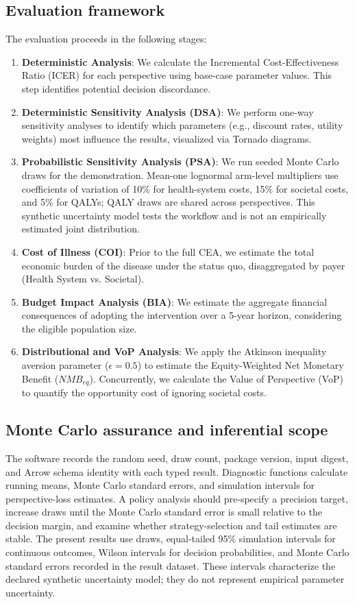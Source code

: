 \documentclass[article]{jss}
\begin{document}
\subsection{Evaluation framework}
The evaluation proceeds in the following stages:
\begin{enumerate}
    \item \textbf{Deterministic Analysis}: We calculate the Incremental Cost-Effectiveness Ratio (ICER) for each perspective using base-case parameter values. This step identifies potential decision discordance.
    \item \textbf{Deterministic Sensitivity Analysis (DSA)}: We perform one-way sensitivity analyses to identify which parameters (e.g., discount rates, utility weights) most influence the results, visualized via Tornado diagrams.
    \item \textbf{Probabilistic Sensitivity Analysis (PSA)}: We run \PublicationDrawCount{} seeded Monte Carlo draws for the demonstration. Mean-one lognormal arm-level multipliers use coefficients of variation of 10\% for health-system costs, 15\% for societal costs, and 5\% for QALYs; QALY draws are shared across perspectives. This synthetic uncertainty model tests the workflow and is not an empirically estimated joint distribution.
    \item \textbf{Cost of Illness (COI)}: Prior to the full CEA, we estimate the total economic burden of the disease under the status quo, disaggregated by payer (Health System vs. Societal).
    \item \textbf{Budget Impact Analysis (BIA)}: We estimate the aggregate financial consequences of adopting the intervention over a 5-year horizon, considering the eligible population size.
    \item \textbf{Distributional and VoP Analysis}: We apply the Atkinson inequality aversion parameter ($\epsilon=0.5$) to estimate the Equity-Weighted Net Monetary Benefit ($NMB_{eq}$). Concurrently, we calculate the Value of Perspective (VoP) to quantify the opportunity cost of ignoring societal costs.
\end{enumerate}

\subsection{Monte Carlo assurance and inferential scope}
The software records the random seed, draw count, package version, input
digest, and Arrow schema identity with each typed result. Diagnostic functions
calculate running means, Monte Carlo standard errors, and simulation intervals
for perspective-loss estimates. A policy analysis should pre-specify a
precision target, increase draws until the Monte Carlo standard error is small
relative to the decision margin, and examine whether strategy-selection and
tail estimates are stable. The present results use \PublicationDrawCount{} draws, equal-tailed
95\% simulation intervals for continuous outcomes, Wilson intervals for
decision probabilities, and Monte Carlo standard errors recorded in the result
dataset. These intervals characterize the declared synthetic uncertainty model;
they do not represent empirical parameter uncertainty.
\end{document}
